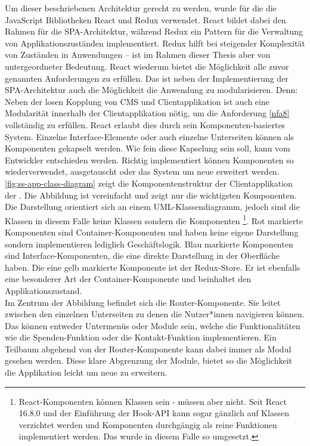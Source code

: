 Um dieser beschriebenen Architektur gerecht zu werden, wurde für die \shst{} die JavaScript
Bibliotheken React \cite{react} und Redux \cite{redux} verwendet. React bildet dabei
den Rahmen für die SPA-Architektur, während Redux ein Pattern für die Verwaltung 
von Applikationszuständen implementiert. Redux hilft bei steigender Komplexität von 
Zuständen in Anwendungen -- ist im Rahmen dieser Thesis aber von untergeordneter Bedeutung.
React wiederum bietet die Möglichkeit alle zuvor genannten Anforderungen zu erfüllen. 
Das ist neben der Implementierung der SPA-Architektur auch die Möglichkeit die 
Anwendung zu modularisieren. Denn: Neben der losen Kopplung von CMS und Clientapplikation
ist auch eine Modularität innerhalb der Clientapplikation nötig, um die Anforderung \ref{nfa8}
vollständig zu erfüllen. React erlaubt dies durch sein Komponenten-basiertes System. Einzelne
Interface-Elemente oder auch einzelne Unterseiten können als Komponenten gekapselt werden.
Wie fein diese Kapselung sein soll, kann vom Entwickler entschieden werden. Richtig implementiert
können Komponenten so wiederverwendet, ausgetauscht oder das System um neue erweitert werden.\\
\autoref{fig:ss-app-class-diagram} zeigt die Komponentenstruktur der Clientapplikation der \shst{}.
Die Abbildung ist vereinfacht und zeigt nur die wichtigsten Komponenten. Die Darstellung orientiert
sich an einem UML-Klassendiagramm, jedoch sind die Klassen in diesem Falle keine Klassen sondern die
Komponenten 
\footnote{React-Komponenten können Klassen sein - müssen aber nicht. Seit React 16.8.0 und
der Einführung der Hook-API \cite{react-hooks} kann sogar gänzlich auf Klassen verzichtet werden und Komponenten 
durchgängig als reine Funktionen implementiert werden. Das wurde in diesem Falle so umgesetzt.}. 
Rot markierte Komponenten sind Container-Komponenten und haben keine eigene Darstellung sondern implementieren 
lediglich Geschäftslogik. Blau markierte Komponenten sind Interface-Komponenten, die eine direkte 
Darstellung in der Oberfläche haben. Die eine gelb markierte Komponente ist der Redux-Store. 
Er ist ebenfalls eine besonderer Art der Container-Komponente und beinhaltet den Applikationszustand.\\
Im Zentrum der Abbildung befindet sich die Router-Komponente. Sie leitet zwischen den einzelnen Unterseiten
zu denen die Nutzer*innen navigieren können. Das können entweder Untermenüs oder Module sein, welche
die Funktionalitäten wie die Spenden-Funktion oder die Kontakt-Funktion implementieren. Ein Teilbaum abgehend 
von der Router-Komponente kann dabei immer als Modul gesehen werden. Diese klare Abgrenzung der Module,
bietet so die Möglichkeit die Applikation leicht um neue zu erweitern.
